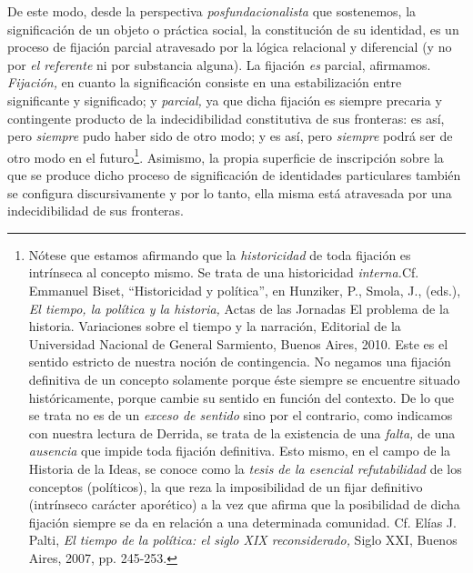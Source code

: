 De este modo, desde la perspectiva \emph{posfundacionalista} que sostenemos, la significación de un objeto o práctica social, la constitución de su identidad, es un proceso de fijación parcial atravesado por la lógica relacional y diferencial (y no por \emph{el referente} ni por substancia alguna). La fijación \emph{es} parcial, afirmamos. \emph{Fijación,} en cuanto la significación consiste en una estabilización entre significante y significado; y \emph{parcial,} ya que dicha fijación es siempre precaria y contingente producto de la indecidibilidad constitutiva de sus fronteras: es así, pero \emph{siempre} pudo haber sido de otro modo; y es así, pero \emph{siempre} podrá ser de otro modo en el futuro\footnote{Nótese que estamos afirmando que la \emph{historicidad} de toda fijación es intrínseca al concepto mismo. Se trata de una historicidad \emph{interna.}Cf. Emmanuel Biset, \enquote{Historicidad y política}, en Hunziker, P., Smola, J., (eds.), \emph{El tiempo, la política y la historia,} Actas de las Jornadas El problema de la historia. Variaciones sobre el tiempo y la narración, Editorial de la Universidad Nacional de General Sarmiento, Buenos Aires, 2010. Este es el sentido estricto de nuestra noción de contingencia. No negamos una fijación definitiva de un concepto solamente porque éste siempre se encuentre situado históricamente, porque cambie su sentido en función del contexto. De lo que se trata no es de un \emph{exceso de sentido} sino por el contrario, como indicamos con nuestra lectura de Derrida, se trata de la existencia de una \emph{falta,} de una \emph{ausencia} que impide toda fijación definitiva. Esto mismo, en el campo de la Historia de la Ideas, se conoce como la \emph{tesis de la esencial refutabilidad} de los conceptos (políticos), la que reza la imposibilidad de un fijar definitivo (intrínseco carácter aporético) a la vez que afirma que la posibilidad de dicha fijación siempre se da en relación a una determinada comunidad. Cf. Elías J. Palti, \emph{El tiempo de la política: el siglo XIX reconsiderado,} Siglo XXI, Buenos Aires, 2007, pp. 245-253.}. Asimismo, la propia superficie de inscripción sobre la que se produce dicho proceso de significación de identidades particulares también se configura discursivamente y por lo tanto, ella misma está atravesada por una indecidibilidad de sus fronteras.

